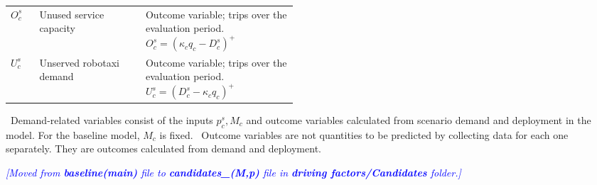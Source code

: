 \documentclass[10pt,a4paper]{article}
\newcommand{\note}{\textreferencemark\ }
\begin{document}
{\begin{tabularx}{\linewidth}{@{}>{\raggedright\arraybackslash}p{0.1\linewidth}>{\raggedright\arraybackslash}p{0.37\linewidth}Y@{}}
$O_c^s$ & Unused service capacity
& Outcome variable; trips over the evaluation period. \newline $O_c^s =(\kappa_c q_c-D_c^s)^+$ \\

$U_c^s$ & Unserved robotaxi demand
& Outcome variable; trips over the evaluation period. \newline $U_c^s=(D_c^s-\kappa_c q_c)^+$ \\


\bottomrule
\end{tabularx}
}

\note Demand-related variables consist of the inputs $p_c^s,M_c$ and outcome variables calculated from scenario demand and deployment in the model. For the baseline model, $M_c$ is fixed.
\note Outcome variables are not quantities to be predicted by collecting data for each one separately. They are outcomes calculated from demand and deployment.

\newpage
\textcolor{blue}{\small\textit{
[Moved from \textbf{baseline(main)} file to \textbf{candidates\_(M,p)} file in \textbf{driving factors/Candidates} folder.]
}}
\end{document}
